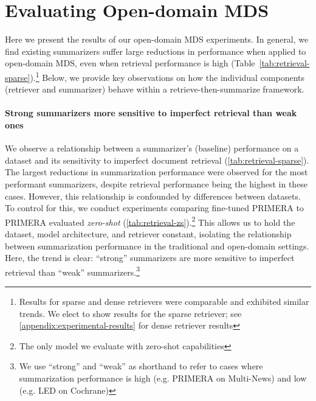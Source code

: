 \documentclass[11pt]{article}
\begin{document}
\vspace{-1.0mm}
\section{Evaluating Open-domain MDS}  \label{experimental-results}
\vspace{-1.0mm}


Here we present the results of our open-domain MDS experiments. In general, we find existing summarizers suffer large reductions in performance when applied to open-domain MDS, even when retrieval performance is high (Table~\ref{tab:retrieval-sparse}).\footnote{Results for sparse and dense retrievers were comparable and exhibited similar trends. We elect to show results for the sparse retriever; see \autoref{appendix:experimental-results} for dense retriever results} Below, we provide key observations on how the individual components (retriever and summarizer) behave within a retrieve-then-summarize framework.

\paragraph{Strong summarizers more sensitive to imperfect retrieval than weak ones}

We observe a relationship between a summarizer's (baseline) performance on a dataset and its sensitivity to imperfect document retrieval (\autoref{tab:retrieval-sparse}). The largest reductions in summarization performance were observed for the most performant summarizers, despite retrieval performance being the highest in these cases. However, this relationship is confounded by differences between datasets. To control for this, we conduct experiments comparing fine-tuned PRIMERA to PRIMERA evaluated \textit{zero-shot} (\autoref{tab:retrieval-zs}).\footnote{The only model we evaluate with zero-shot capabilities} This allows us to hold the dataset, model architecture, and retriever constant, isolating the relationship between summarization performance in the traditional and open-domain settings. Here, the trend is clear: ``strong'' summarizers are more sensitive to imperfect retrieval than ``weak'' summarizers.\footnote{We use ``strong'' and ``weak'' as shorthand to refer to cases where summarization performance is high (e.g. PRIMERA on Multi-News) and low (e.g. LED on Cochrane)}
\end{document}
